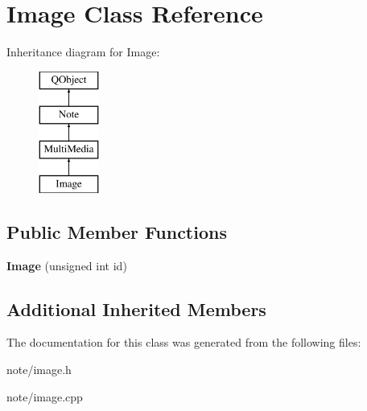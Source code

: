 \hypertarget{class_image}{\section{Image Class Reference}
\label{class_image}
}
Inheritance diagram for Image\-:\begin{figure}[H]
\begin{center}
\leavevmode
\includegraphics[height=4.000000cm]{class_image}
\end{center}
\end{figure}
\subsection*{Public Member Functions}
\begin{DoxyCompactItemize}
\item 
\hypertarget{class_image_a11d4de6fe7dcdf1ef922c9d63f34ca0e}{{\bfseries Image} (unsigned int id)}\label{class_image_a11d4de6fe7dcdf1ef922c9d63f34ca0e}

\end{DoxyCompactItemize}
\subsection*{Additional Inherited Members}


The documentation for this class was generated from the following files\-:\begin{DoxyCompactItemize}
\item 
note/image.\-h\item 
note/image.\-cpp\end{DoxyCompactItemize}
